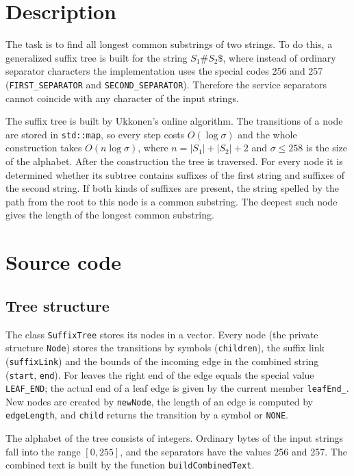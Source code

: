 \section{Description}

The task is to find all longest common substrings of two strings. To do this, a generalized
suffix tree is built for the string $S_1 \# S_2 \$$, where instead of ordinary separator
characters the implementation uses the special codes 256 and 257
(\texttt{FIRST\_SEPARATOR} and \texttt{SECOND\_SEPARATOR}). Therefore the service separators
cannot coincide with any character of the input strings.

The suffix tree is built by Ukkonen's online algorithm. The transitions of a node are stored in
\texttt{std::map}, so every step costs $O(\log \sigma)$ and the whole construction takes
$O(n \log \sigma)$, where $n = |S_1| + |S_2| + 2$ and $\sigma \le 258$ is the size of the alphabet.
After the construction
the tree is traversed. For every node it is determined whether its subtree contains suffixes
of the first string and suffixes of the second string. If both kinds of suffixes are present,
the string spelled by the path from the root to this node is a common substring.
The deepest such node gives the length of the longest common substring.

\pagebreak

\section{Source code}

\subsection{Tree structure}

The class \texttt{SuffixTree} stores its nodes in a vector. Every node (the private structure
\texttt{Node}) stores the transitions by symbols (\texttt{children}), the suffix link
(\texttt{suffixLink}) and the bounds of the incoming edge in the combined string
(\texttt{start}, \texttt{end}). For leaves the right end of the edge equals the special value
\texttt{LEAF\_END}; the actual end of a leaf edge is given by the current member
\texttt{leafEnd\_}. New nodes are created by \texttt{newNode}, the length of an edge is computed
by \texttt{edgeLength}, and \texttt{child} returns the transition by a symbol or \texttt{NONE}.

The alphabet of the tree consists of integers. Ordinary bytes of the input strings fall into
the range $[0,255]$, and the separators have the values 256 and 257. The combined text is
built by the function \texttt{buildCombinedText}.

